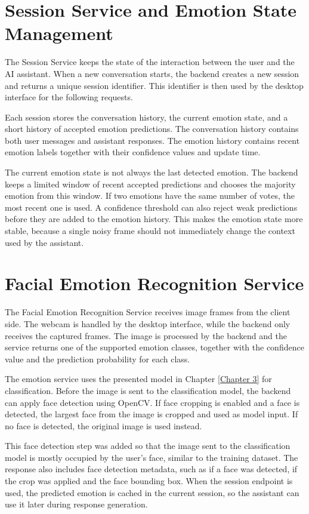 \section{Session Service and Emotion State Management}

The Session Service keeps the state of the interaction between the user and the AI assistant. When a new conversation starts, the backend creates a new session and returns a unique session identifier. This identifier is then used by the desktop interface for the following requests.

Each session stores the conversation history, the current emotion state, and a short history of accepted emotion predictions. The conversation history contains both user messages and assistant responses. The emotion history contains recent emotion labels together with their confidence values and update time.

The current emotion state is not always the last detected emotion. The backend keeps a limited window of recent accepted predictions and chooses the majority emotion from this window. If two emotions have the same number of votes, the most recent one is used. A confidence threshold can also reject weak predictions before they are added to the emotion history. This makes the emotion state more stable, because a single noisy frame should not immediately change the context used by the assistant.

\section{Facial Emotion Recognition Service}

The Facial Emotion Recognition Service receives image frames from the client side. The webcam is handled by the desktop interface, while the backend only receives the captured frames. The image is processed by the backend and the service returns one of the supported emotion classes, together with the confidence value and the prediction probability for each class.

The emotion service uses the presented model in Chapter \ref{Chapter 3} for classification. Before the image is sent to the classification model, the backend can apply face detection using OpenCV. If face cropping is enabled and a face is detected, the largest face from the image is cropped and used as model input. If no face is detected, the original image is used instead.

This face detection step was added so that the image sent to the classification model is mostly occupied by the user's face, similar to the training dataset. The response also includes face detection metadata, such as if a face was detected, if the crop was applied and the face bounding box. When the session endpoint is used, the predicted emotion is cached in the current session, so the assistant can use it later during response generation.

